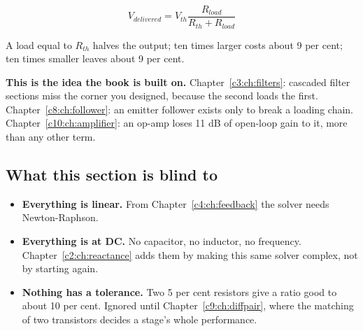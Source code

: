 
\[
  V_{delivered} = V_{th} \frac{R_{load}}{R_{th} + R_{load}}
\]

A load equal to $R_{th}$ halves the output; ten times larger costs about 9 per cent; ten times smaller leaves about 9 per cent.

\textbf{This is the idea the book is built on.} Chapter~\ref{c3:ch:filters}: cascaded filter sections miss the corner you designed, because the second loads the first. Chapter~\ref{c8:ch:follower}: an emitter follower exists only to break a loading chain. Chapter~\ref{c10:ch:amplifier}: an op-amp loses 11 dB of open-loop gain to it, more than any other term.

\subsection{What this section is blind to}
\label{c1:sec:a7}
\begin{itemize}
  \item \textbf{Everything is linear.} From Chapter~\ref{c4:ch:feedback} the solver needs Newton-Raphson.
  \item \textbf{Everything is at DC.} No capacitor, no inductor, no frequency. Chapter~\ref{c2:ch:reactance} adds them by making this same solver complex, not by starting again.
  \item \textbf{Nothing has a tolerance.} Two 5 per cent resistors give a ratio good to about 10 per cent. Ignored until Chapter~\ref{c9:ch:diffpair}, where the matching of two transistors decides a stage's whole performance.
\end{itemize}
